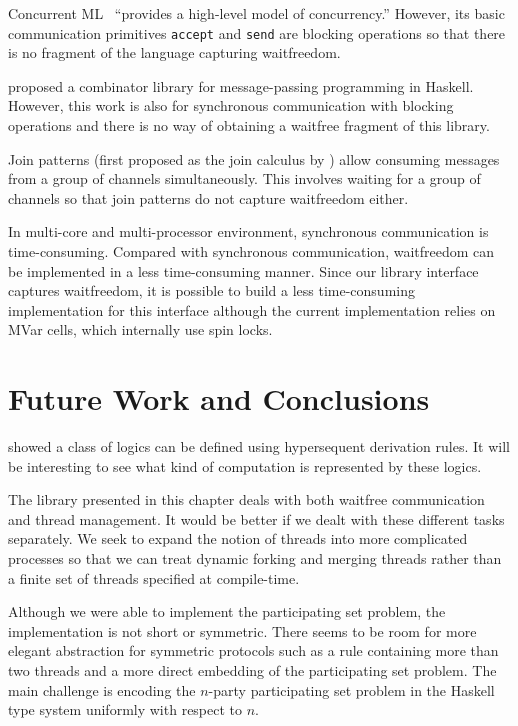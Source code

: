 Concurrent ML~\citep{concurrentML} ``provides a high-level model of
concurrency.''  However, its basic communication primitives
\texttt{accept} and \texttt{send} are blocking operations so that there
is no fragment of the language capturing waitfreedom.

\citet{Brown} proposed a combinator library for message-passing
programming in Haskell.  However, this work is also for synchronous
communication with blocking operations and there is no way of
obtaining a waitfree
fragment of this library.

Join patterns (first proposed as the join calculus by \citet{join}) allow
consuming messages from a group of
channels simultaneously.  This involves waiting for a group of channels
so that join patterns do not capture waitfreedom either.

In multi-core and multi-processor environment, synchronous communication
is time-consuming.  Compared with
synchronous communication, waitfreedom can be implemented in a less
time-consuming manner.  Since our library
interface captures waitfreedom, it is possible to build a less
time-consuming implementation for this interface although the current
implementation relies on MVar cells, which internally use spin locks.

\section{Future Work and Conclusions}

\citet*{alg} showed a class of logics can be defined using
hypersequent derivation rules.  It will be interesting to see what kind
of computation is represented by these logics.

The library presented in this chapter deals with both waitfree
communication and thread management.  It would be better if we dealt with
these different tasks separately.
We seek to expand the notion of threads into more complicated
processes so that we can treat dynamic forking and merging threads rather
than a finite set of threads specified at compile-time.

Although we were able to implement the participating set problem,
the implementation is not short or symmetric.
There seems to be room for more elegant abstraction for symmetric
protocols such as
a rule containing more than two threads and a more direct embedding of the
participating set problem.  The main challenge is encoding the
$n$-party participating set problem in the Haskell type system uniformly
with respect to $n$.

